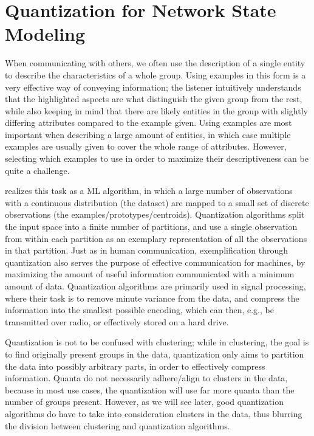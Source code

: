\chapter{Quantization for Network State Modeling}
	\label{cha:quantization}
	
	When communicating with others, we often use the description of a single entity to describe the characteristics of a whole group.
	Using examples in this form is a very effective way of conveying information; the listener intuitively understands that the highlighted aspects are what distinguish the given group from the rest, while also keeping in mind that there are likely entities in the group with slightly differing attributes compared to the example given.
	Using examples are most important when describing a large amount of entities, in which case multiple examples are usually given to cover the whole range of attributes.
	However, selecting which examples to use in order to maximize their descriptiveness can be quite a challenge.
	
	 realizes this task as a \ac{ML} algorithm, in which a large number of observations with a continuous distribution (the dataset) are mapped to a small set of discrete observations (the examples/prototypes/centroids).
	Quantization algorithms split the input space into a finite number of partitions, and use a single observation from within each partition as an exemplary representation of all the observations in that partition.
	Just as in human communication, exemplification through quantization also serves the purpose of effective communication for machines, by maximizing the amount of useful information communicated with a minimum amount of data.
	Quantization algorithms are primarily used in signal processing, where their task is to remove minute variance from the data, and compress the information into the smallest possible encoding, which can then, e.g., be transmitted over radio, or effectively stored on a hard drive.
	
	Quantization is not to be confused with clustering; while in clustering, the goal is to find originally present groups in the data, quantization only aims to partition the data into possibly arbitrary parts, in order to effectively compress information.
	Quanta do not necessarily adhere/align to clusters in the data, because in most use cases, the quantization will use far more quanta than the number of groups present.
	However, as we will see later, good quantization algorithms do have to take into consideration clusters in the data, thus blurring the division between clustering and quantization algorithms.
	
